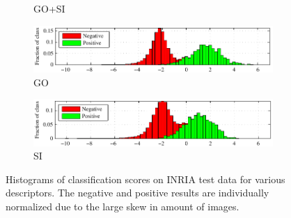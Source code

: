 \documentclass[thesis.tex]{subfiles}
\begin{document}
\begin{figure}
\begin{subfigure}[t]{\textwidth}
		\caption{GO+SI}
		\label{fig:inriaHistogramGoSiFinal}
	\end{subfigure}
	\begin{subfigure}[t]{\textwidth}
		\includegraphics[width=\textwidth]{img/inriaHistogramGoFinal.pdf}
		\caption{GO}
		\label{fig:inriaHistogramGoFinal}
	\end{subfigure}
	\begin{subfigure}[t]{\textwidth}
		\includegraphics[width=\textwidth]{img/inriaHistogramSiFinal.pdf}
		\caption{SI}
		\label{fig:inriaHistogramSiFinal}
	\end{subfigure}
	\caption{Histograms of classification scores on INRIA test data for various descriptors. The negative and positive results are individually normalized due to the large skew in amount of images.}
	\label{fig:inriaHistogram}
\end{figure}
%
\subbibliography
\end{document}
